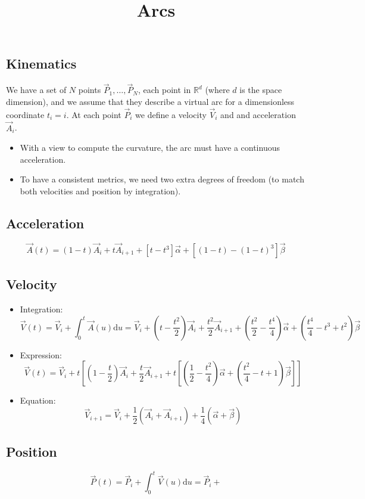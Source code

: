 \documentclass[aps,12pt]{revtex4}
\begin{document}
\title{Arcs}
\maketitle
	

\subsection{Kinematics}

We have a set of $N$ points $\vec{P}_1,\ldots,\vec{P}_N$, each point in $\mathbb{R}^d$ (where $d$ is the space dimension), and we assume
that they describe a virtual arc for a dimensionless coordinate $t_i=i$.
At each point $\vec{P}_i$ we define a velocity $\vec{V}_i$ and and acceleration $\vec{A}_i$.
\begin{itemize}
\item With a view to compute the curvature, the arc must have a continuous acceleration.
\item To have a consistent metrics, we need two extra degrees of freedom (to match both velocities and position by integration).
\end{itemize}

\subsection{Acceleration}

\begin{equation}
	\vec{A}(t) = (1-t)\vec{A}_i + t  \vec{A}_{i+1} + \left[ t - t^3 \right] \vec{\alpha} + \left[ (1-t) - (1-t)^3 \right] \vec{\beta}
\end{equation}

\subsection{Velocity}
\begin{itemize}
\item Integration:
\begin{equation}
	\vec{V}(t) = \vec{V}_i + \int_0^t \vec{A}(u)\mathrm{d}u = \vec{V}_i + \left(t-\dfrac{t^2}{2}\right) \vec{A}_i + \dfrac{t^2}{2} \vec{A}_{i+1} + \left(\dfrac{t^2}{2} - \dfrac{t^4}{4} \right) \vec{\alpha} + \left(\dfrac{t^4}{4} - t^3 + t^2\right) \vec{\beta}
\end{equation}

\item Expression:
\begin{equation}
 \vec{V}(t) = \vec{V}_i + t 
 \left[ \left(1-\dfrac{t}{2}\right) \vec{A}_i + \dfrac{t}{2} \vec{A}_{i+1} +
  t \left [
  \left(\dfrac{1}{2} - \dfrac{t^2}{4} \right) \vec{\alpha} + \left(\dfrac{t^2}{4} - t + 1\right) \vec{\beta}
  \right ]
 \right]
\end{equation}

\item Equation:
\begin{equation}
\vec{V}_{i+1} = \vec{V}_i + \dfrac{1}{2}\left(\vec{A}_i + \vec{A}_{i+1}\right) + \dfrac{1}{4} \left( \vec{\alpha} + \vec{\beta}\right)
\end{equation}

\end{itemize}

\subsection{Position}
\begin{equation}
	\vec{P}(t) = \vec{P}_{i} + \int_0^t \vec{V}(u)\mathrm{d}u = \vec{P}_i + 
\end{equation}
\end{document}
